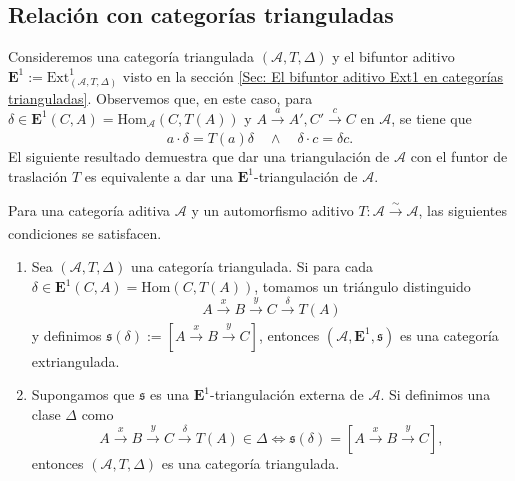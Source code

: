 \documentclass[tesis]{subfiles}
\begin{document}
\subsection*{Relación con categorías trianguladas} \label{Ssec: Relación con categorías trianguladas}

Consideremos una categoría triangulada $(\mathscr{A},T,\Delta)$ y el bifuntor aditivo $\mathbf{E}^1:=\text{Ext}^1_{(\mathscr{A},T,\Delta)}$ visto en la sección \ref{Sec: El bifuntor aditivo Ext1 en categorías trianguladas}. Observemos que, en este caso, para $\delta\in\mathbf{E}^1(C,A)=\text{Hom}_\mathscr{A}(C,T(A))$ y $A\xrightarrow[]{a}A', C'\xrightarrow[]{c}C$ en $\mathscr{A}$, se tiene que
\[
    a\cdot\delta = T(a)\delta \quad \land \quad \delta\cdot c = \delta c.
\] 
El siguiente resultado demuestra que dar una triangulación de $\mathscr{A}$ con el funtor de traslación $T$ es equivalente a dar una $\mathbf{E}^1$-triangulación de $\mathscr{A}$.

\begin{Prop}\cite[Proposition 3.22]{NakaokaPalu}\label{NakaokaPalu-3.22}
    Para una categoría aditiva $\mathscr{A}$ y un automorfismo aditivo $T:\mathscr{A}\xrightarrow[]{\sim}\mathscr{A}$, las siguientes condiciones se satisfacen.

    \begin{enumerate}[label=(\alph*)]
    
        \item Sea $(\mathscr{A},T,\Delta)$ una categoría triangulada. Si para cada $\delta\in\mathbf{E}^1(C,A) = \text{Hom}(C,T(A))$, tomamos un triángulo distinguido
            \[
                A\xrightarrow[]{x}B\xrightarrow[]{y}C\xrightarrow[]{\delta}T(A)
            \] 
            y definimos $\mathfrak{s}(\delta) := [A\xrightarrow[]{x}B\xrightarrow[]{y}C]$, entonces $(\mathscr{A},\mathbf{E}^1,\mathfrak{s})$ es una categoría extriangulada.

        \item Supongamos que $\mathfrak{s}$ es una $\mathbf{E}^1$-triangulación externa de $\mathscr{A}$. Si definimos una clase $\Delta$ como
            \[
                A\xrightarrow[]{x}B\xrightarrow[]{y}C\xrightarrow[]{\delta}T(A)\in\Delta \iff \mathfrak{s}(\delta) = [A\xrightarrow[]{x}B\xrightarrow[]{y}C],
            \] 
            entonces $(\mathscr{A},T,\Delta)$ es una categoría triangulada.
            
    \end{enumerate}
\end{Prop}
\end{document}
